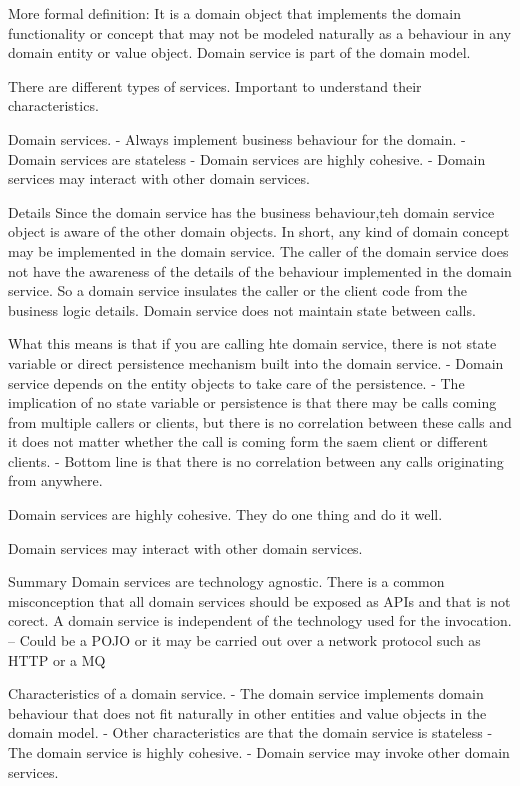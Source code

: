 More formal definition:
It is a domain object that implements the domain functionality or concept that may not be modeled naturally as a behaviour in any domain entity or value object.
Domain service is part of the domain model.

There are different types of services. Important to understand their characteristics.

Domain services.
- Always implement business behaviour for the domain.
- Domain services are stateless
- Domain services are highly cohesive.
- Domain services may interact with other domain services.

Details
Since the domain service has the business behaviour,teh domain service object is aware of the other domain objects.
In short, any kind of domain concept may be implemented in the domain service.
The caller of the domain service does not have the awareness of the details of the behaviour implemented in the domain service.
So a domain service insulates the caller or the client code from the business logic details.
Domain service does not maintain state between calls.

What this means is that if you are calling hte domain service, there is not state variable or direct persistence mechanism built into the domain service.
- Domain service depends on the entity objects to take care of the persistence.
- The implication of no state variable or persistence is that there may be calls coming from multiple callers or clients, but there is no correlation between these calls and it does not matter whether the call is coming form the saem client or different clients.
- Bottom line is that there is no correlation between any calls originating from anywhere.

Domain services are highly cohesive.
They do one thing and do it well.

Domain services may interact with other domain services.

Summary
Domain services are technology agnostic.
There is a common misconception that all domain services should be exposed as APIs and that is not corect.
A domain service is independent of the technology used for the invocation.
-- Could be a POJO or it may be carried out over a network protocol such as HTTP or a MQ

Characteristics of a domain service.
- The domain service implements domain behaviour that does not fit naturally in other entities and value objects in the domain model.
- Other characteristics are that the domain service is stateless
- The domain service is highly cohesive.
- Domain service may invoke other domain services.


